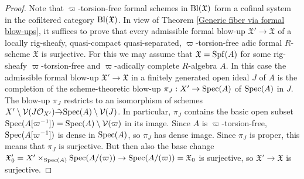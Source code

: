 \documentclass[12pt,twoside,a4paper]{article}
\theoremstyle{definition}
\theoremstyle{remark}
\newcommand\Bl{{\rm Bl}}
\newcommand\Spec{{\rm Spec}}
\newcommand\Spf{{\rm Spf}}
\begin{document}
\begin{proof}Note that $\varpi$-torsion-free formal schemes in $\Bl(\mathfrak{X})$ form a cofinal system in the cofiltered category $\Bl(\mathfrak{X})$. In view of Theorem \ref{Generic fiber via formal blow-ups}, it suffices to prove that every admissible formal blow-up $\mathfrak{X}'\to \mathfrak{X}$ of a locally rig-sheafy, quasi-compact quasi-separated, $\varpi$-torsion-free adic formal $R$-scheme $\mathfrak{X}$ is surjective. For this we may assume that $\mathfrak{X}=\Spf(A)$ for some rig-sheafy $\varpi$-torsion-free and $\varpi$-adically complete $R$-algebra $A$. In this case the admissible formal blow-up $\mathfrak{X}'\to \mathfrak{X}$ in a finitely generated open ideal $J$ of $A$ is the completion of the scheme-theoretic blow-up $\pi_{J}: X'\to \Spec(A)$ of $\Spec(A)$ in $J$. The blow-up $\pi_{J}$ restricts to an isomorphism of schemes $X'\setminus\mathcal{V}(J\mathcal{O}_{X'})\tilde{\to}\Spec(A)\setminus\mathcal{V}(J)$. In particular, $\pi_{J}$ contains the basic open subset $\Spec(A[\varpi^{-1}])=\Spec(A)\setminus\mathcal{V}(\varpi)$ in its image. Since $A$ is $\varpi$-torsion-free, $\Spec(A[\varpi^{-1}])$ is dense in $\Spec(A)$, so $\pi_{J}$ has dense image. Since $\pi_{J}$ is proper, this means that $\pi_{J}$ is surjective. But then also the base change $\mathfrak{X}'_{0}=X'\times_{\Spec(A)}\Spec(A/(\varpi))\to \Spec(A/(\varpi))=\mathfrak{X}_{0}$ is surjective, so $\mathfrak{X}'\to \mathfrak{X}$ is surjective.\end{proof}
\end{document}
